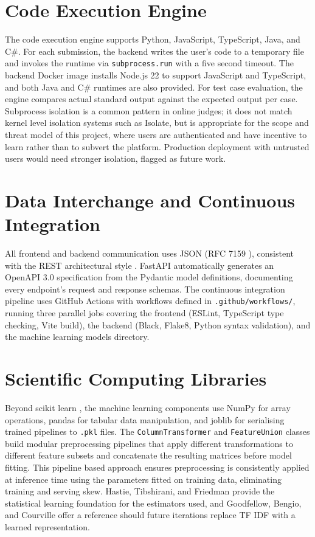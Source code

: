 \section{Code Execution Engine}

The code execution engine supports Python, JavaScript, TypeScript,
Java, and C\#. For each submission, the backend writes the user's
code to a temporary file and invokes the runtime via
\texttt{subprocess.run} with a five second timeout. The backend Docker
image installs Node.js 22 to support JavaScript and TypeScript, and
both Java and C\# runtimes are also provided. For test case
evaluation, the engine compares actual standard output against the
expected output per case. Subprocess isolation is a common pattern in
online judges; it does not match kernel level isolation systems such
as Isolate, but is appropriate for the scope and threat model of this
project, where users are authenticated and have incentive to learn
rather than to subvert the platform. Production deployment with
untrusted users would need stronger isolation, flagged as future work.

\section{Data Interchange and Continuous Integration}

All frontend and backend communication uses JSON (RFC 7159
\cite{json2014}), consistent with the REST architectural style
\cite{fielding2000rest}. FastAPI automatically generates an OpenAPI
3.0 specification \cite{openapi2025} from the Pydantic model
definitions, documenting every endpoint's request and response
schemas. The continuous integration pipeline uses GitHub Actions
\cite{githubactions2025} with workflows defined in
\texttt{.github/workflows/}, running three parallel jobs covering the
frontend (ESLint, TypeScript type checking, Vite build), the backend
(Black, Flake8, Python syntax validation), and the machine learning
models directory.

\section{Scientific Computing Libraries}

Beyond scikit learn \cite{pedregosa2011,buitinck2013api}, the machine
learning components use NumPy \cite{numpy2020} for array operations,
pandas \cite{mckinney2010pandas} for tabular data manipulation, and
joblib \cite{joblib2025} for serialising trained pipelines to
\texttt{.pkl} files. The \texttt{ColumnTransformer} and
\texttt{FeatureUnion} classes build modular preprocessing pipelines
that apply different transformations to different feature subsets and
concatenate the resulting matrices before model fitting. This pipeline
based approach ensures preprocessing is consistently applied at
inference time using the parameters fitted on training data,
eliminating training and serving skew. Hastie, Tibshirani, and
Friedman \cite{hastie2009esl} provide the statistical learning
foundation for the estimators used, and Goodfellow, Bengio, and
Courville \cite{goodfellow2016deep} offer a reference should future
iterations replace TF IDF with a learned representation.